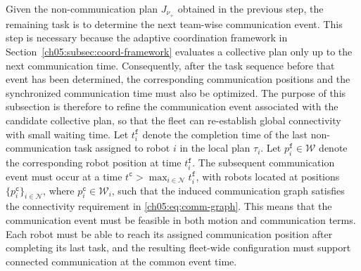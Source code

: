 Given the non-communication plan $J_{\nu_+}$ obtained in the previous step,
the remaining task is to determine the next team-wise communication event.
This step is necessary because the adaptive coordination framework in
Section~\ref{ch05:subsec:coord-framework} evaluates a collective plan only up
to the next communication time. Consequently, after the task sequence before
that event has been determined, the corresponding communication positions and
the synchronized communication time must also be optimized. The purpose of this
subsection is therefore to refine the communication event associated with the
candidate collective plan, so that the fleet can re-establish global
connectivity with small waiting time.
Let $t_i^{\texttt{f}}$ denote the completion time of the last
non-communication task assigned to robot $i$ in the local plan $\tau_i$. Let
$p_i^{\texttt{f}} \in \mathcal{W}$ denote the corresponding robot position at
time $t_i^{\texttt{f}}$. The subsequent communication event must occur at a
time $t^{\texttt{c}} > \max_{i \in \mathcal{N}} t_i^{\texttt{f}}$, with robots
located at positions $\{p_i^{\texttt{c}}\}_{i \in \mathcal{N}}$, where
$p_i^{\texttt{c}} \in \mathcal{W}_i$, such that the induced communication graph
satisfies the connectivity requirement in \eqref{ch05:eq:comm-graph}. This
means that the communication event must be feasible in both motion and
communication terms. Each robot must be able to reach its assigned
communication position after completing its last task, and the resulting
fleet-wide configuration must support connected communication at the common
event time.

